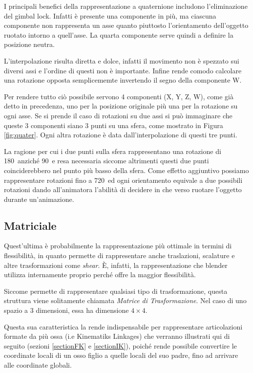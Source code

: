 I principali benefici della rappresentazione a quaternione includono l'eliminazione del gimbal lock. Infatti è presente una componente in più, ma ciascuna componente non rappresenta un asse quanto piuttosto l'orientamento dell'oggetto ruotato intorno a quell'asse. La quarta componente serve quindi a definire la posizione neutra.

L'interpolazione risulta diretta e dolce, infatti il movimento non è spezzato sui diversi assi e l'ordine di questi non è importante. Infine rende comodo calcolare una rotazione opposta semplicememte invertendo il segno della componente W.

Per rendere tutto ciò possibile servono 4 componenti (X, Y, Z, W), come già detto in precedenza, uno per la posizione originale più una per la rotazione su ogni asse. Se si prende il caso di rotazioni su due assi si può immaginare che queste 3 componenti siano 3 punti su una sfera, come mostrato in Figura \ref{fig:quater}. Ogni altra rotazione è data dall'interpolazione di questi tre punti.

La ragione per cui i due punti sulla sfera rappresentano una rotazione di 180\textdegree\ anziché 90\textdegree\ e resa necessaria siccome altrimenti questi due punti coinciderebbero nel punto più basso della sfera. Come effetto aggiuntivo possiamo rappresentare rotazioni fino a 720\textdegree\ ed ogni orientamento equivale a due possibili rotazioni dando all'animatora l'abilità di decidere in che verso ruotare l'oggetto durante un'animazione. 

\subsection{Matriciale}
Quest'ultima è probabilmente la rappresentazione più ottimale in termini di flessibilità, in quanto permette di rappresentare anche traslazioni, scalature e altre trasformazioni come \emph{shear}. È, infatti, la rappresentazione che blender utilizza internamente \cite{blendApi} \cite{nat2012rig} proprio perché offre la maggior flessibilità.

Siccome permette di rappresentare qualsiasi tipo di trasformazione, questa struttura viene solitamente chiamata \emph{Matrice di Trasformazione}. Nel caso di uno spazio a 3 dimensioni, essa ha dimensione $4\times4$.

Questa sua caratteristica la rende indispensabile per rappresentare articolazioni formate da più ossa (i.e Kinematiks Linkages) che verranno illustrati qui di seguito (sezioni \ref{sectionFK} e \ref{sectionIK}), poiché rende possibile convertire le coordinate locali di un osso figlio a quelle locali del suo padre, fino ad arrivare alle coordinate globali.

